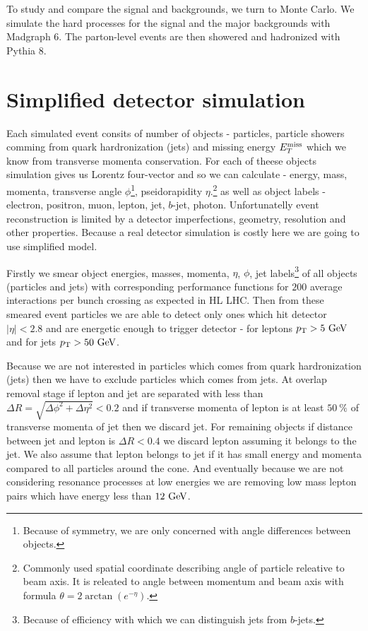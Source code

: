 \documentclass[tightenline,notitlepage,nofootinbib]{revtex4-1}
\begin{document}
To study and compare the signal and backgrounds, we turn to Monte Carlo. We simulate the hard processes for the signal and the major backgrounds with Madgraph 6. The parton-level events are then showered and hadronized with Pythia 8. 

\section{Simplified detector simulation}

Each simulated event consits of number of objects - particles, particle showers comming from quark hardronization (jets) and missing energy $E^{\rm{miss}}_T$ which we know from transverse momenta conservation. For each of theese objects simulation gives us Lorentz four-vector and so we can calculate - energy, mass, momenta, transverse angle $\phi$\footnote{Because of symmetry, we are only concerned with angle differences between objects.}, pseidorapidity $\eta$.\footnote{Commonly used spatial coordinate describing angle of particle releative to beam axis. It is releated to angle between momentum and beam axis with formula $\theta=2 \arctan (e^{-\eta})$.} as well as object labels - electron, positron, muon, lepton, jet, $b$-jet, photon. Unfortunatelly event reconstruction is limited by a detector imperfections, geometry, resolution and other properties. Because a real detector simulation is costly here we are going to use simplified model.

Firstly we smear object energies, masses, momenta, $\eta$, $\phi$, jet labels\footnote{Because of efficiency with which we can distinguish jets from $b$-jets.} of all objects (particles and jets) with corresponding performance functions for $200$ average interactions per bunch crossing as expected in HL LHC. Then from these smeared event particles we are able to detect only ones which hit detector $|\eta|<2.8$ and are energetic enough to trigger detector - for leptons  $p_{\rm{T}} > 5~\rm{GeV} $ and for jets $p_{\rm T}>50~\rm{GeV}$.

Because we are not interested in particles which comes from quark hardronization (jets) then we have to exclude particles which comes from jets. At overlap removal stage if lepton and jet are separated with less than $\Delta R = \sqrt{\Delta \phi^2 + \Delta \eta^2}<0.2$ and if transverse momenta of lepton is at least $50~ \%$ of transverse momenta of jet then we discard jet. For remaining objects if distance between jet and lepton is $\Delta R < 0.4$ we discard lepton assuming it belongs to the jet. We also assume that lepton belongs to jet if it has small energy and momenta compared to all particles around the cone. And eventually because we are not considering resonance processes at low energies we are removing low mass lepton pairs which have energy less than $12 ~\rm{GeV}$.
\end{document}
